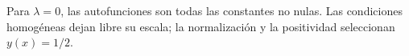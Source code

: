 Para \(\lambda=0\), las autofunciones son todas las constantes no nulas. Las condiciones homogéneas dejan libre su escala; la normalización y la positividad seleccionan \(y(x)=1/2\).
